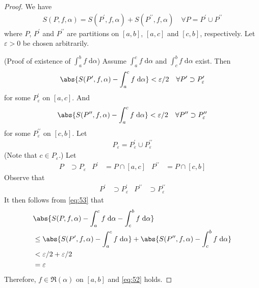 \documentclass[thmcnt=section, 12pt]{elegantbook}
\begin{document}
\begin{proof}
    We have 
    \begin{align}
        S(P,f,\alpha) = S(P^\prime, f, \alpha) + S(P^{\prime\prime}, f, \alpha)
        \quad
        \forall P = P^\prime \cup P^{\prime\prime}
        \label{eq:53}
    \end{align}
    where $P$, $P^\prime$ and $P^{\prime\prime}$ are partitions on $[a, b]$, $[a, c]$ and $[c, b]$, respectively. Let $\varepsilon > 0$ be chosen arbitrarily.



    \par (Proof of existence of $\int_a^b f \; \mathrm{d}\alpha$) Assume $\int_a^c f \; \mathrm{d}\alpha$ and $\int_c^b f \; \mathrm{d}\alpha$ exist. Then 
    \begin{align*}
        \abs{S(P^\prime, f, \alpha) - \int_a^c f \; \mathrm{d}\alpha} < \varepsilon / 2
        \quad \forall P^\prime \supset P_\varepsilon^\prime
    \end{align*}
    for some $P_\varepsilon^\prime$ on $[a, c]$. And 
    \begin{align*}
        \abs{S(P^{\prime\prime}, f, \alpha) - \int_a^c f \; \mathrm{d}\alpha} < \varepsilon / 2
        \quad \forall P^{\prime\prime} \supset P_\varepsilon^{\prime\prime}
    \end{align*}
    for some $P_\varepsilon^{\prime\prime}$ on $[c, b]$. Let
    \begin{align*}
        P_\varepsilon = P_\varepsilon^\prime \cup P_\varepsilon^{\prime\prime}
    \end{align*}
    (Note that $c \in P_\varepsilon$.) Let
    \begin{align*}
        P &\supset P_\varepsilon &
        P^\prime &= P \cap [a, c] &
        P^{\prime\prime} &= P \cap [c, b]
    \end{align*}
    Observe that
    \begin{align*}
        P^\prime &\supset P_\varepsilon^\prime & 
        P^{\prime\prime} &\supset P_\varepsilon^{\prime\prime}
    \end{align*}
    It then follows from \eqref{eq:53} that
    \begin{align*}
        &\abs{
            S(P, f, \alpha)
            - \int_a^c f \; \mathrm{d}\alpha
            - \int_c^b f \; \mathrm{d}\alpha 
        } \\ 
        &\leq \abs{
            S(P^\prime, f, \alpha)
            - \int_a^c f \; \mathrm{d}\alpha
        } + \abs{
            S(P^{\prime\prime}, f, \alpha)
            - \int_c^b f \; \mathrm{d}\alpha
        } \\ 
        &< \varepsilon / 2 + \varepsilon / 2 \\ 
        &= \varepsilon
    \end{align*} 
    Therefore, $f \in \mathfrak{R}(\alpha)$ on $[a, b]$ and \eqref{eq:52} holds.




\end{proof}
\end{document}
